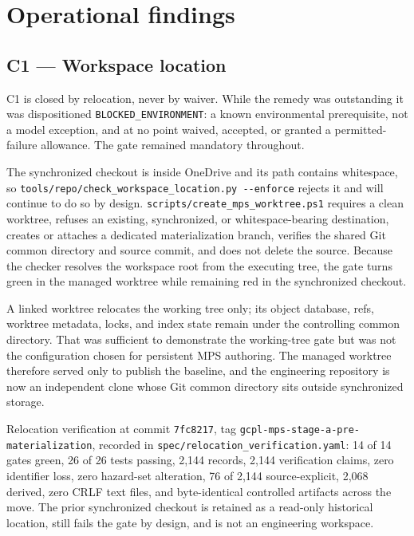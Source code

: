\documentclass[11pt,letterpaper]{article}
\begin{document}
\section{Operational findings}

\subsection{C1 --- Workspace location}

C1 is closed by relocation, never by waiver. While the remedy was outstanding it was dispositioned \texttt{BLOCKED\_ENVIRONMENT}: a known environmental prerequisite, not a model exception, and at no point waived, accepted, or granted a permitted-failure allowance. The gate remained mandatory throughout.

The synchronized checkout is inside OneDrive and its path contains whitespace, so \nolinkurl{tools/repo/check_workspace_location.py --enforce} rejects it and will continue to do so by design. \nolinkurl{scripts/create_mps_worktree.ps1} requires a clean worktree, refuses an existing, synchronized, or whitespace-bearing destination, creates or attaches a dedicated materialization branch, verifies the shared Git common directory and source commit, and does not delete the source. Because the checker resolves the workspace root from the executing tree, the gate turns green in the managed worktree while remaining red in the synchronized checkout.

A linked worktree relocates the working tree only; its object database, refs, worktree metadata, locks, and index state remain under the controlling common directory. That was sufficient to demonstrate the working-tree gate but was not the configuration chosen for persistent MPS authoring. The managed worktree therefore served only to publish the baseline, and the engineering repository is now an independent clone whose Git common directory sits outside synchronized storage.

Relocation verification at commit \texttt{7fc8217}, tag \texttt{gcpl-mps-stage-a-pre-materialization}, recorded in \nolinkurl{spec/relocation_verification.yaml}: 14 of 14 gates green, 26 of 26 tests passing, 2,144 records, 2,144 verification claims, zero identifier loss, zero hazard-set alteration, 76 of 2,144 source-explicit, 2,068 derived, zero CRLF text files, and byte-identical controlled artifacts across the move. The prior synchronized checkout is retained as a read-only historical location, still fails the gate by design, and is not an engineering workspace.
\end{document}
